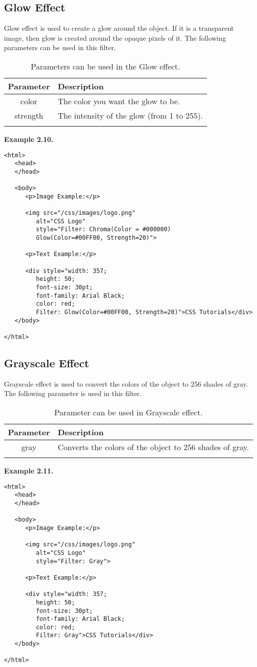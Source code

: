 \documentclass[a4paper,oneside]{book}
\numberwithin{equation}{chapter}
\begin{document}
\subsection{Glow Effect}
Glow effect is used to create a glow around the object. If it is a transparent image, then glow is created around the opaque pixels of it. The following parameters can be used in this filter.
\begin{center}
\begin{longtable}{|c|l|}
\hline
\textbf{Parameter} & \textbf{Description}\\
\hline
color & The color you want the glow to be.\\
\hline
strength & The intensity of the glow (from 1 to 255).\\
\hline
\caption{Parameters can be used in the Glow effect.}
\end{longtable}
\end{center}
\textbf{Example 2.10.} 
\begin{verbatim}
<html>
   <head>
   </head>
   
   <body>
      <p>Image Example:</p>
      
      <img src="/css/images/logo.png" 
         alt="CSS Logo" 
         style="Filter: Chroma(Color = #000000) 
         Glow(Color=#00FF00, Strength=20)">
      
      <p>Text Example:</p>
      
      <div style="width: 357; 
         height: 50; 
         font-size: 30pt; 
         font-family: Arial Black; 
         color: red; 
         Filter: Glow(Color=#00FF00, Strength=20)">CSS Tutorials</div>
   </body>
   
</html> 
\end{verbatim}
\subsection{Grayscale Effect}
Grayscale effect is used to convert the colors of the object to 256 shades of gray. The following parameter is used in this filter.
\begin{center}
\begin{longtable}{|c|l|}
\hline
\textbf{Parameter} & \textbf{Description}\\
\hline
gray & Converts the colors of the object to 256 shades of gray.\\
\hline
\caption{Parameter can be used in Grayscale effect.}
\end{longtable}
\end{center}
\textbf{Example 2.11.}
\begin{verbatim}
<html>
   <head>
   </head>
   
   <body>
      <p>Image Example:</p>
      
      <img src="/css/images/logo.png" 
         alt="CSS Logo" 
         style="Filter: Gray">
      
      <p>Text Example:</p>
      
      <div style="width: 357; 
         height: 50; 
         font-size: 30pt; 
         font-family: Arial Black; 
         color: red; 
         Filter: Gray">CSS Tutorials</div>
   </body>
   
</html> 
\end{verbatim}
\end{document}
